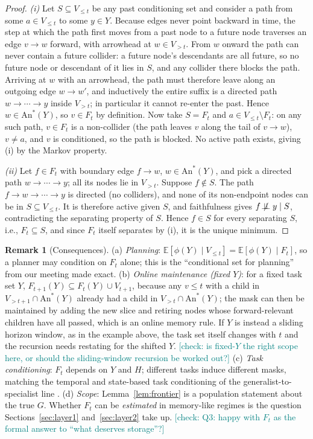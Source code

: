 \documentclass[11pt]{article}
\newcommand{\nindep}{\not\!\perp\!\!\!\perp}
\newcommand{\An}{\mathrm{An}}
\newcommand{\past}{V_{\le t}}
\newcommand{\future}{V_{> t}}
\newcommand{\checkY}[1]{\textcolor{teal}{\footnotesize [check: #1]}}
\theoremstyle{plain}
\theoremstyle{definition}
\newtheorem{remark}{Remark}
\begin{document}
\begin{proof}
\emph{(i)} Let $S \subseteq \past$ be any past conditioning set and consider a path from some $a \in \past$ to some $y \in Y$. Because edges never point backward in time, the step at which the path first moves from a past node to a future node traverses an edge $v \to w$ forward, with arrowhead at $w \in \future$. From $w$ onward the path can never contain a future collider: a future node's descendants are all future, so no future node or descendant of it lies in $S$, and any collider there blocks the path. Arriving at $w$ with an arrowhead, the path must therefore leave along an outgoing edge $w \to w'$, and inductively the entire suffix is a directed path $w \to \cdots \to y$ inside $\future$; in particular it cannot re-enter the past. Hence $w \in \An^*(Y)$, so $v \in F_t$ by definition. Now take $S = F_t$ and $a \in \past \setminus F_t$: on any such path, $v \in F_t$ is a non-collider (the path leaves $v$ along the tail of $v \to w$), $v \ne a$, and $v$ is conditioned, so the path is blocked. No active path exists, giving (i) by the Markov property.

\emph{(ii)} Let $f \in F_t$ with boundary edge $f \to w$, $w \in \An^*(Y)$, and pick a directed path $w \to \cdots \to y$; all its nodes lie in $\future$. Suppose $f \notin S$. The path $f \to w \to \cdots \to y$ is directed (no colliders), and none of its non-endpoint nodes can be in $S \subseteq \past$. It is therefore active given $S$, and faithfulness gives $f \nindep y \mid S$, contradicting the separating property of $S$. Hence $f \in S$ for every separating $S$, i.e., $F_t \subseteq S$, and since $F_t$ itself separates by (i), it is the unique minimum.
\end{proof}

\begin{remark}[Consequences]\label{rem:frontier}
(a) \emph{Planning}: $\mathbb{E}[\phi(Y) \mid \past] = \mathbb{E}[\phi(Y) \mid F_t]$, so a planner may condition on $F_t$ alone; this is the ``conditional set for planning'' from our meeting made exact.
(b) \emph{Online maintenance (fixed $Y$)}: for a fixed task set $Y$, $F_{t+1}(Y) \subseteq F_t(Y) \cup V_{t+1}$, because any $v \le t$ with a child in $V_{> t+1} \cap \An^*(Y)$ already had a child in $V_{>t} \cap \An^*(Y)$; the mask can then be maintained by adding the new slice and retiring nodes whose forward-relevant children have all passed, which is an online memory rule. If $Y$ is instead a sliding horizon window, as in the example above, the task set itself changes with $t$ and the recursion needs restating for the shifted $Y$. \checkY{is fixed-$Y$ the right scope here, or should the sliding-window recursion be worked out?}
(c) \emph{Task conditioning}: $F_t$ depends on $Y$ and $H$; different tasks induce different masks, matching the temporal and state-based task conditioning of the generalist-to-specialist line \cite{zheng2026specialist}.
(d) \emph{Scope}: Lemma~\ref{lem:frontier} is a population statement about the true $G$. Whether $F_t$ can be \emph{estimated} in memory-like regimes is the question Sections~\ref{sec:layer1} and~\ref{sec:layer2} take up. \checkY{Q3: happy with $F_t$ as the formal answer to ``what deserves storage''?}
\end{remark}
\end{document}
